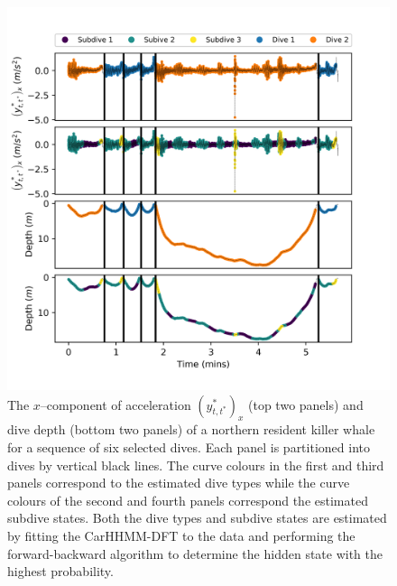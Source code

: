\begin{figure}[ht]
	\centering
	\includegraphics[width=4.75in]{../Plots/CarHHMM2_decoded_dives.png}
	\caption{The $x$--component of acceleration $\left(y^*_{t,t^*}\right)_x$ (top two panels) and dive depth (bottom two panels) of a northern resident killer whale for a sequence of six selected dives. Each panel is partitioned into dives by vertical black lines. The curve colours in the first and third panels correspond to the estimated dive types while the curve colours of the second and fourth panels correspond the estimated subdive states. Both the dive types and subdive states are estimated by fitting the CarHHMM-DFT to the data and performing the forward-backward algorithm to determine the hidden state with the highest probability.}
	\label{fig:labeled_dives}
\end{figure}

